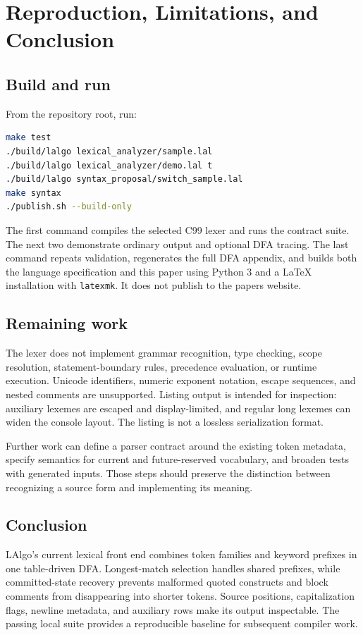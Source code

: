 \documentclass[11pt,a4paper]{article}
\newcommand{\code}[1]{\texttt{#1}}
\begin{document}
\clearpage
\section{Reproduction, Limitations, and Conclusion}
\subsection{Build and run}
From the repository root, run:
\begin{lstlisting}[language=bash]
make test
./build/lalgo lexical_analyzer/sample.lal
./build/lalgo lexical_analyzer/demo.lal t
./build/lalgo syntax_proposal/switch_sample.lal
make syntax
./publish.sh --build-only
\end{lstlisting}
The first command compiles the selected C99 lexer and runs the contract suite.
The next two demonstrate ordinary output and optional DFA tracing. The last
command repeats validation, regenerates the full DFA appendix, and builds both
the language specification and this paper using Python 3 and a LaTeX installation
with \code{latexmk}. It does not publish to the papers website.

\subsection{Remaining work}
The lexer does not implement grammar recognition, type checking, scope
resolution, statement-boundary rules, precedence evaluation, or runtime
execution. Unicode identifiers, numeric exponent notation, escape sequences,
and nested comments are unsupported. Listing output is intended for inspection:
auxiliary lexemes are escaped and display-limited, and regular long lexemes can
widen the console layout. The listing is not a lossless serialization format.

Further work can define a parser contract around the existing token metadata,
specify semantics for current and future-reserved vocabulary, and broaden tests
with generated inputs. Those steps should preserve the distinction between
recognizing a source form and implementing its meaning.

\subsection{Conclusion}
LAlgo's current lexical front end combines token families and keyword prefixes
in one table-driven DFA. Longest-match selection handles shared prefixes,
while committed-state recovery prevents malformed quoted constructs and block
comments from disappearing into shorter tokens. Source positions, capitalization
flags, newline metadata, and auxiliary rows make its output inspectable. The
passing local suite provides a reproducible baseline for subsequent compiler work.
\end{document}
